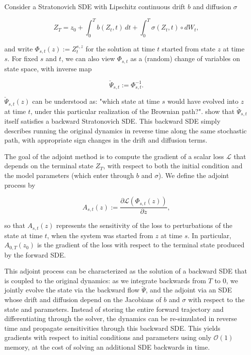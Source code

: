 Consider a Stratonovich SDE with Lipschitz continuous drift \(b\) and diffusion \(\sigma\)

\[
Z_T = z_0 + \int_0^T b(Z_t, t)\,dt + \int_0^T \sigma(Z_t, t) \circ dW_t,
\]

and write \(\Phi_{s,t}(z) := Z_t^{s,z}\) for the solution at time \(t\) started from state \(z\) at time \(s\). For fixed \(s\) and \(t\), we can also view \(\Phi_{s,t}\) as a (random) change of variables on state space, with
inverse map

\[
\check{\Psi}_{s,t} := \Phi_{s,t}^{-1}.
\]

\(\check{\Psi}_{s,t}(z)\) can be understood as: "which state at time \(s\) would have evolved into \(z\) at
time \(t\), under this particular realization of the Brownian path?". \textcite{liScalableGradientsStochastic2020} show
that \(\check{\Psi}_{s,t}\) itself satisfies a backward Stratonovich SDE. This backward SDE
simply describes running the original dynamics in reverse time along the same stochastic path, with appropriate sign
changes in the drift and diffusion terms.

The goal of the adjoint method is to compute the gradient of a scalar loss \(\mathcal{L}\) that depends on the terminal
state \(Z_T\), with respect to both the initial condition and the model parameters (which enter through \(b\) and
\(\sigma\)). We define the adjoint process by

\[
A_{s,t}(z) := \frac{\partial \mathcal{L}(\Phi_{s,t}(z))}{\partial z},
\]

so that \(A_{s,t}(z)\) represents the sensitivity of the loss to perturbations of the state at time \(t\), when the
system was started from \(z\) at time \(s\). In particular, \(A_{0,T}(z_0)\) is the gradient of the loss with respect to
the terminal state produced by the forward SDE. 

This adjoint process can be characterized as the solution of a backward SDE that is coupled to the original dynamics: as we integrate backwards from \(T\) to
\(0\), we jointly evolve the state via the backward flow \(\check{\Psi}\), and the adjoint via an SDE whose
drift and diffusion depend on the Jacobians of \(b\) and \(\sigma\) with respect to the state and parameters. Instead of
storing the entire forward trajectory and differentiating through the solver, the
dynamics can be re-simulated in reverse time and propagate sensitivities through this backward SDE. This yields
gradients with respect to initial conditions and parameters using only \(\mathcal{O}(1)\) memory, at the cost of solving
an additional SDE backwards in time.


